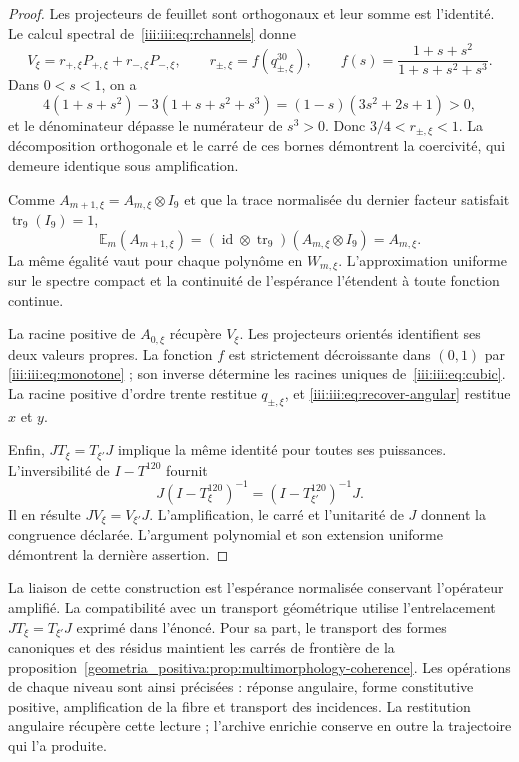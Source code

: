 \begin{proof}
Les projecteurs de feuillet sont orthogonaux et leur somme est l’identité. Le calcul spectral de~\eqref{iii:iii:eq:rchannels} donne
\[
 V_\xi=r_{+,\xi}P_{+,\xi}+r_{-,\xi}P_{-,\xi},\qquad
 r_{\pm,\xi}=f(q_{\pm,\xi}^{30}),\qquad
 f(s)=\frac{1+s+s^2}{1+s+s^2+s^3}.
\]
Dans $0<s<1$, on a
\[
 4(1+s+s^2)-3(1+s+s^2+s^3)
 =(1-s)(3s^2+2s+1)>0,
\]
et le dénominateur dépasse le numérateur de $s^3>0$. Donc $3/4<r_{\pm,\xi}<1$. La décomposition orthogonale et le carré de ces bornes démontrent la coercivité, qui demeure identique sous amplification.

Comme $A_{m+1,\xi}=A_{m,\xi}\otimes I_9$ et que la trace normalisée du dernier facteur satisfait $\operatorname{tr}_9(I_9)=1$,
\[
 \mathbb E_m(A_{m+1,\xi})
 =(\operatorname{id}\otimes\operatorname{tr}_9)
 (A_{m,\xi}\otimes I_9)=A_{m,\xi}.
\]
La même égalité vaut pour chaque polynôme en $W_{m,\xi}$. L’approximation uniforme sur le spectre compact et la continuité de l’espérance l’étendent à toute fonction continue.

La racine positive de $A_{0,\xi}$ récupère $V_\xi$. Les projecteurs orientés identifient ses deux valeurs propres. La fonction $f$ est strictement décroissante dans $(0,1)$ par \eqref{iii:iii:eq:monotone} ; son inverse détermine les racines uniques de~\eqref{iii:iii:eq:cubic}. La racine positive d’ordre trente restitue $q_{\pm,\xi}$, et \eqref{iii:iii:eq:recover-angular} restitue $x$ et $y$.

Enfin, $JT_\xi=T_{\xi'}J$ implique la même identité pour toutes ses puissances. L’inversibilité de $I-T^{120}$ fournit
\[
 J(I-T_\xi^{120})^{-1}
 =(I-T_{\xi'}^{120})^{-1}J.
\]
Il en résulte $JV_\xi=V_{\xi'}J$. L’amplification, le carré et l’unitarité de $J$ donnent la congruence déclarée. L’argument polynomial et son extension uniforme démontrent la dernière assertion.
\end{proof}

La liaison de cette construction est l’espérance normalisée conservant l’opérateur amplifié. La compatibilité avec un transport géométrique utilise l’entrelacement $JT_\xi=T_{\xi'}J$ exprimé dans l’énoncé. Pour sa part, le transport des formes canoniques et des résidus maintient les carrés de frontière de la proposition~\ref{geometria_positiva:prop:multimorphology-coherence}. Les opérations de chaque niveau sont ainsi précisées : réponse angulaire, forme constitutive positive, amplification de la fibre et transport des incidences. La restitution angulaire récupère cette lecture ; l’archive enrichie conserve en outre la trajectoire qui l’a produite.

